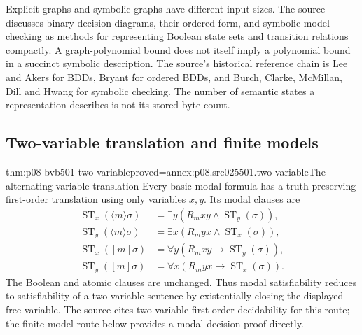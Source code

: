 Explicit graphs and symbolic graphs have different input sizes. The source
discusses binary decision diagrams, their ordered form, and symbolic model
checking as methods for representing Boolean state sets and transition
relations compactly. A graph-polynomial bound does not itself imply a
polynomial bound in a succinct symbolic description. The source's
historical reference chain is Lee and Akers for BDDs, Bryant for ordered
BDDs, and Burch, Clarke, McMillan, Dill and Hwang for symbolic checking.
The number of semantic states a representation describes is not its
stored byte count.

\subsection{Two-variable translation and finite models}
\label{sec:p08-bvb501-filtration}

\begin{hbtheorem}{thm:p08-bvb501-two-variable}{proved=annex:p08.src025501.two-variable}{The alternating-variable translation}
Every basic modal formula has a truth-preserving first-order translation
using only variables \(x,y\). Its modal clauses are
\[
 \begin{aligned}
 \operatorname{ST}_x(\langle m\rangle\sigma)&=
   \exists y(R_mxy\land\operatorname{ST}_y(\sigma)),\\
 \operatorname{ST}_y(\langle m\rangle\sigma)&=
   \exists x(R_myx\land\operatorname{ST}_x(\sigma)),\\
 \operatorname{ST}_x([m]\sigma)&=
   \forall y(R_mxy\to\operatorname{ST}_y(\sigma)),\\
 \operatorname{ST}_y([m]\sigma)&=
   \forall x(R_myx\to\operatorname{ST}_x(\sigma)).
 \end{aligned}
\]
The Boolean and atomic clauses are unchanged. Thus modal satisfiability
reduces to satisfiability of a two-variable sentence by existentially
closing the displayed free variable. The source cites two-variable
first-order decidability for this route; the finite-model route below
provides a modal decision proof directly.
\end{hbtheorem}

